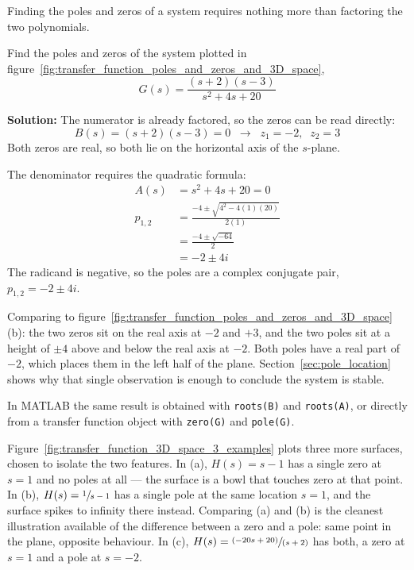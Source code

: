 \documentclass[12pt,letter]{article}
\begin{document}
Finding the poles and zeros of a system requires nothing more than factoring the two polynomials.

\begin{example}
	Find the poles and zeros of the system plotted in figure~\ref{fig:transfer_function_poles_and_zeros_and_3D_space},
	\begin{equation}
		G(s) = \frac{(s+2)(s-3)}{s^2+4s+20}
	\end{equation}

	\noindent \textbf{Solution:} The numerator is already factored, so the zeros can be read directly:
	\begin{equation}
		B(s) = (s+2)(s-3) = 0 \; \; \rightarrow \; \; z_1 = -2, \; \; z_2 = 3
	\end{equation}
	Both zeros are real, so both lie on the horizontal axis of the $s$-plane.

	The denominator requires the quadratic formula:
	\begin{align}
		A(s) &= s^2+4s+20 = 0 \\
		p_{1,2} &= \frac{-4 \pm \sqrt{4^2 - 4(1)(20)}}{2(1)} \nonumber \\
		&= \frac{-4 \pm \sqrt{-64}}{2} \nonumber \\
		&= -2 \pm 4i \nonumber
	\end{align}
	The radicand is negative, so the poles are a complex conjugate pair, $p_{1,2} = -2 \pm 4i$.

	Comparing to figure~\ref{fig:transfer_function_poles_and_zeros_and_3D_space}(b): the two zeros sit on the real axis at $-2$ and $+3$, and the two poles sit at a height of $\pm 4$ above and below the real axis at $-2$. Both poles have a real part of $-2$, which places them in the left half of the plane. Section~\ref{sec:pole_location} shows why that single observation is enough to conclude the system is stable.

	In MATLAB the same result is obtained with \texttt{roots(B)} and \texttt{roots(A)}, or directly from a transfer function object with \texttt{zero(G)} and \texttt{pole(G)}.
\end{example}

Figure~\ref{fig:transfer_function_3D_space_3_examples} plots three more surfaces, chosen to isolate the two features. In (a), $H(s) = s-1$ has a single zero at $s=1$ and no poles at all --- the surface is a bowl that touches zero at that point. In (b), $H(s) = \sfrac{1}{s-1}$ has a single pole at the same location $s = 1$, and the surface spikes to infinity there instead. Comparing (a) and (b) is the cleanest illustration available of the difference between a zero and a pole: same point in the plane, opposite behaviour. In (c), $H(s) = \sfrac{(-20s+20)}{(s+2)}$ has both, a zero at $s=1$ and a pole at $s=-2$.
\end{document}
